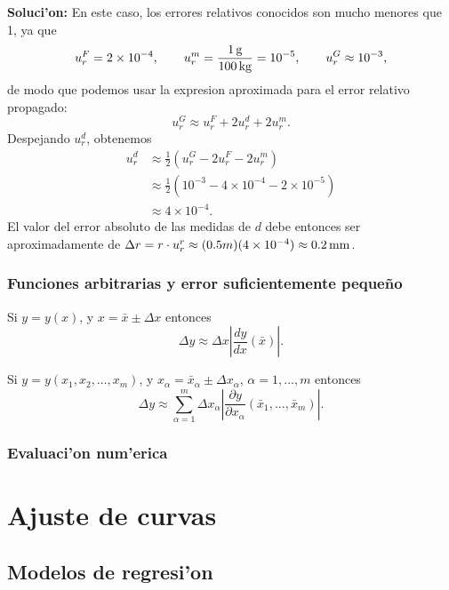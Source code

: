 \documentclass[letterpaper,11pt]{report}
\begin{document}
\textbf{Soluci'on:} En este caso, los errores relativos conocidos son mucho menores que 1, ya que
\begin{equation}
u_r^F =2\times 10^{-4}, \qquad u_r^m = \frac{1\,\rm g}{100\,\rm kg}  = 10^{-5}, \qquad u_r^G\approx 10^{-3},
\end{equation}
de modo que podemos usar la expresion aproximada para el error relativo propagado:
\begin{equation}
u_r^G \approx u_r^F + 2u_r^d + 2u_r^m.
\end{equation}
Despejando $u_r^d$, obtenemos
\begin{align}
u_r^d &\approx \frac{1}{2}\left(u_r^G - 2u_r^F - 2u_r^m\right) \\
& \approx\frac{1}{2}\left(10^{-3} - 4\times 10^{-4} - 2\times 10^{-5}\right) \\
& \approx 4\times 10^{-4}.
\end{align}
El valor del error absoluto de las medidas de $d$ debe entonces ser aproximadamente de $\Delta r = r\cdot u_r^r \approx (0.5 m)(4\times 10^{-4})\approx 0.2\,\rm mm$.

\subsection{Funciones arbitrarias y error suficientemente peque\~no}

Si $y=y(x)$, y $x=\bar{x}\pm \Delta x$ entonces
\begin{equation}
\Delta y \approx \Delta x \left|\frac{dy}{dx}(\bar{x})\right|.
\end{equation}

Si $y=y(x_1,x_2,\dots,x_m)$, y $x_\alpha=\bar{x}_\alpha\pm \Delta x_\alpha$, $\alpha=1,\dots, m$ entonces
\begin{equation}
\Delta y \approx \sum_{\alpha=1}^m\Delta x_\alpha \left|\frac{\partial y}{\partial x_\alpha}(\bar{x}_1,\dots,\bar{x}_m)\right|.
\end{equation}

\subsection{Evaluaci'on num'erica}

\chapter{Ajuste de curvas}

\section{Modelos de regresi'on}
\end{document}
